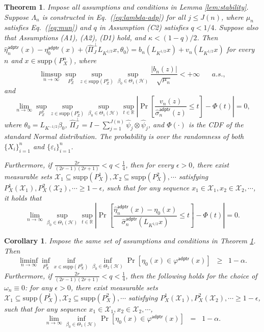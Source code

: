 \documentclass[11pt,a4paper]{article}
\renewcommand{\hat}{\widehat}
\theoremstyle{definition}
\theoremstyle{plain}
\newtheorem{theorem}{Theorem}[section]
\newtheorem{corollary}{Corollary}[section]
\theoremstyle{remark}
\newcommand{\supp}{\mathrm{supp}}
\newcommand{\mX}{\mathcal X}
\newcommand{\mH}{\mathcal H}
\newcommand{\adptr}{\mathsf{adptr}}
\begin{document}
\begin{theorem}
Impose all assumptions and conditions in Lemma \ref{lem:stability}. Suppose $\Lambda_n$ is constructed in Eq.~(\ref{eq:lambda-adp}) for all $j\leq J(n)$,
where $\mu_n$ satisfies Eq.~(\ref{eq:mun}) and $q$ in Assumption (C2) satisfies $q<1/4$. Suppose also that Assumptions (A1), (A2), (D1) hold, and $\kappa<(1-q)/2$. Then 
$\hat\eta_n^\adptr(x)-\eta_0^\adptr(x)+\langle\hat\Pi_J^\perp L_{K^{1/2}}x,\theta_0\rangle = b_n(L_{K^{1/2}}x)+v_n(L_{K^{1/2}}x)$ for every $n$ and $x\in\supp(P_X^n)$, where
$$
\limsup_{n\to\infty}\sup_{P_Z^n}\sup_{z\in\supp(P_Z^n)}\sup_{\beta_0\in\Theta_1(\mH)} \frac{|b_n(z)|}{\sqrt{\mu_n}} < +\infty\;\;\;\;\;\;a.s.,
$$
and
$$
\lim_{n\to\infty} \sup_{P_Z^n}\sup_{z\in\supp(P_Z^n)}\sup_{\beta_0\in\Theta_1(\mH)}\sup_{t\in\mathbb R}\left|\Pr\left[\frac{v_n(z)}{\hat\sigma_n^\adptr(z)}\leq t\right] - \Phi(t)\right| = 0,
$$
where $\theta_0=L_{K^{-1/2}}\beta_0$, $\hat\Pi_J^\perp = I - \sum_{j=1}^{J(n)}\hat\psi_j\otimes\hat\psi_j$, and $\Phi(\cdot)$ is the CDF of the standard Normal distribution.
The probability is over the randomness of both $\{X_i\}_{i=1}^n$ and $\{\varepsilon_i\}_{i=1}^n$. 

Furthermore, if $\frac{2r}{(2r-1)(2r+1)}<q<\frac{1}{4}$, then for every $\epsilon>0$, there exist measurable sets $\mX_1\subseteq\supp(P_X^1),\mX_2\subseteq\supp(P_X^2),\cdots$ satisfying $P_X^1(\mX_1),P_X^2(\mX_2),\cdots\geq 1-\epsilon$,
such that for any sequence $x_1\in\mX_1,x_2\in\mX_2,\cdots$, it holds that
$$
\lim_{n\to\infty} \sup_{\beta_0\in\Theta_1(\mH)}\sup_{t\in\mathbb R}\left|\Pr\left[\frac{\hat\eta_n^\adptr(x)-\eta_0(x)}{\hat\sigma_n^\adptr(L_{K^{1/2}}x)}\leq t\right] - \Phi(t)\right| = 0.
$$
%
\label{thm:adptr-limiting}
\end{theorem}

\begin{corollary}
Impose the same set of assumptions and conditions in Theorem \ref{thm:adptr-limiting}. Then
$$
\liminf_{n\to\infty}\inf_{P_X^n}\inf_{x\in\supp(P_X^n)}\inf_{\beta_0\in\Theta_2(\mH)}\Pr[\eta_0(x)\in\varphi^\adptr(x)] \;\;\geq\;\; 1-\alpha.
$$
Furthermore, if $\frac{2r}{(2r-1)(2r+1)}<q<\frac{1}{4}$, then the following holds for the choice of $\omega_n\equiv 0$:
for any $\epsilon>0$, there exist measurable sets $\mX_1\subseteq\supp(P_X^1),\mX_2\subseteq\supp(P_X^2),\cdots$ satisfying $P_X^1(\mX_1),P_X^2(\mX_2),\cdots\geq 1-\epsilon$,
such that for any sequence $x_1\in\mX_1,x_2\in\mX_2,\cdots$, 
$$
\lim_{n\to\infty}\inf_{\beta_0\in\Theta_1(\mH)} \Pr[\eta_0(x)\in\varphi^\adptr(x)] \;\; = \;\; 1-\alpha.
$$
\label{cor:adptr}
\end{corollary}
\end{document}
